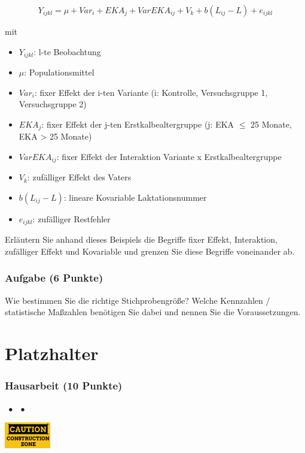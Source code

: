 \documentclass[a4paper, 9pt]{scrartcl}\usepackage[]{graphicx}\usepackage[]{xcolor}
\begin{document}
\begin{equation*}
  Y_{ijkl} = \mu + Var_i + EKA_j + VarEKA_{ij} + V_k + b(L_{ij} - L) + e_{ijkl}
\end{equation*}

mit

\begin{itemize}
\item $Y_{ijkl}$: l-te Beobachtung
\item $\mu$: Populationsmittel 
\item $Var_i$: fixer Effekt der i-ten Variante (i: Kontrolle,
  Versuchsgruppe 1, Versuchsgruppe 2)
\item $EKA_j$: fixer Effekt der j-ten Erstkalbealtergruppe (j: EKA $\leq$ 25
  Monate, EKA > 25 Monate)
\item $VarEKA_{ij}$: fixer Effekt der Interaktion Variante x
  Erstkalbealtergruppe 
\item $V_k$: zuf{\"a}lliger Effekt des Vaters 
\item $b(L_{ij} - L)$: lineare Kovariable Laktationsnummer 
\item $e_{ijkl}$: zuf{\"a}lliger
  Restfehler
\end{itemize}
Erl{\"a}utern Sie anhand dieses Beispiels die Begriffe fixer Effekt,
Interaktion, zuf{\"a}lliger Effekt und Kovariable und grenzen Sie diese
Begriffe voneinander ab.



\section{Aufgabe \hfill (6 Punkte)}
Wie bestimmen Sie die richtige Stichprobengr{\"o}{\ss}e? Welche Kennzahlen /
statistische Ma{\ss}zahlen ben{\"o}tigen Sie dabei und nennen Sie die
Voraussetzungen.

 
\clearpage
\part{Platzhalter}

\section{Hausarbeit \hfill (10 Punkte)}

\ifcollection
\begin{flushright}
\tiny\vspace{-3Ex}
\textbf{\examinhaltstart}
\exammodulestat $\;\bullet$
\exammodulestatversuch $\;\bullet$
\exammodulelanddaten 
\end{flushright}
\hfill
\href{https://youtu.be/GNoORO7GfAE}{\includegraphics[width = 2cm]{img/caution}}
\fi
\end{document}
